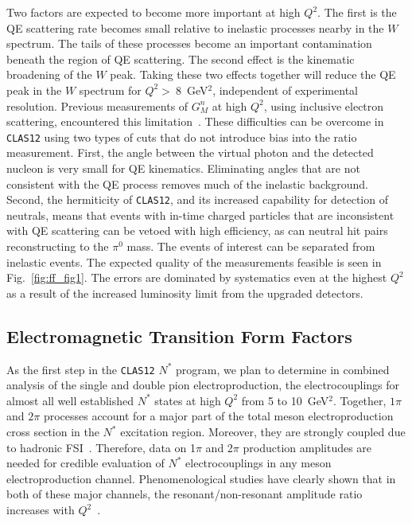 Two factors are expected to become more important at high $Q^2$.  The 
first is the QE scattering rate becomes small relative to inelastic 
processes nearby in the $W$ spectrum. The tails of these processes become 
an important contamination beneath the region of QE scattering.  The 
second effect is the kinematic broadening of the $W$ peak.  Taking these 
two effects together will reduce the QE peak in the $W$ spectrum for 
$Q^2>~8$~GeV$^2$, independent of experimental resolution.  Previous 
measurements of $G_M^n$ at high $Q^2$, using inclusive electron scattering, 
encountered this limitation~\cite{ROCK}.  These difficulties can be 
overcome in {\tt CLAS12} using two types of cuts that do not introduce 
bias into the ratio measurement. First, the angle between the virtual 
photon and the detected nucleon is very small for QE kinematics. 
Eliminating angles that are not consistent with the QE process removes 
much of the inelastic background.  Second, the hermiticity of {\tt CLAS12}, 
and its increased capability for detection of neutrals, means that events 
with in-time charged particles that are inconsistent with QE scattering 
can be vetoed with high efficiency, as can neutral hit pairs reconstructing 
to the $\pi^0$ mass.  The events of interest can be separated from 
inelastic events.  The expected quality of the measurements feasible is 
seen in Fig.~\ref{fig:ff_fig1}. The errors are dominated by systematics 
even at the highest $Q^2$ as a result of the increased luminosity limit 
from the upgraded detectors. 

\subsection{Electromagnetic Transition Form Factors}
\label{sec:tranff}

As the first step in the {\tt CLAS12} $N^*$ program, we plan to 
determine in combined analysis of the single and double pion
electroproduction, the electrocouplings for almost all well established 
$N^*$ states at high $Q^2$ from 5 to 10~GeV$^2$. Together, $1\pi$ and
$2\pi$ processes account for a major part of the total meson 
electroproduction cross section in the $N^*$ excitation region. 
Moreover, they are strongly coupled due to hadronic FSI~\cite{Mo06}. 
Therefore, data on 1$\pi$ and 2$\pi$ production amplitudes are needed for 
credible evaluation of $N^*$ electrocouplings in any meson electroproduction 
channel.  Phenomenological studies have clearly shown that in both of these 
major channels, the resonant/non-resonant amplitude ratio increases with 
$Q^2$~\cite{Pr06}.

